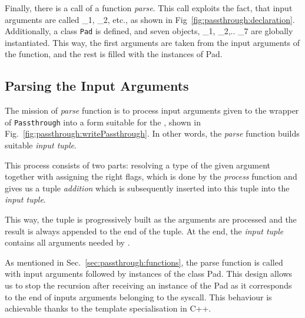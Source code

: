 Finally, there is a call of a function \textit{parse}. This call exploits the fact, that input arguments are called \_1, \_2, etc., as shown in Fig~\ref{fig:passthrough:declaration}. Additionally, a class \texttt{Pad} is defined, and seven objects, \_1, \_2,.. \_7 are globally instantiated. This way, the first arguments are taken from the input arguments of the function, and the rest is filled with the instances of Pad.

\subsection{Parsing the Input Arguments} \label{sec:passthrough:parse}

The mission of \textit{parse} function is to process input arguments given to the wrapper of \texttt{Passthrough} into a form suitable for the \vmsyscall, shown in Fig.~\ref{fig:passthrough:writePassthrough}. In other words, the \textit{parse} function builds suitable \textit{input tuple}.

This process consists of two parts: resolving a type of the given argument together with assigning the right flags, which is done by the \textit{process} function and gives us a tuple \textit{addition} which is subsequently inserted into this tuple into the \textit{input tuple}.

This way, the tuple is progressively built as the arguments are processed and the result is always appended to the end of the tuple. At the end, the \textit{input tuple} contains all arguments needed by \vmsyscall. 

As mentioned in Sec.~\ref{sec:passthrough:functions}, the parse function is called with input arguments followed by instances of the class Pad. This design allows us to stop the recursion after receiving an instance of the Pad as it corresponds to the end of inputs arguments belonging to the syscall. This behaviour is achievable thanks to the template specialisation in C++.

